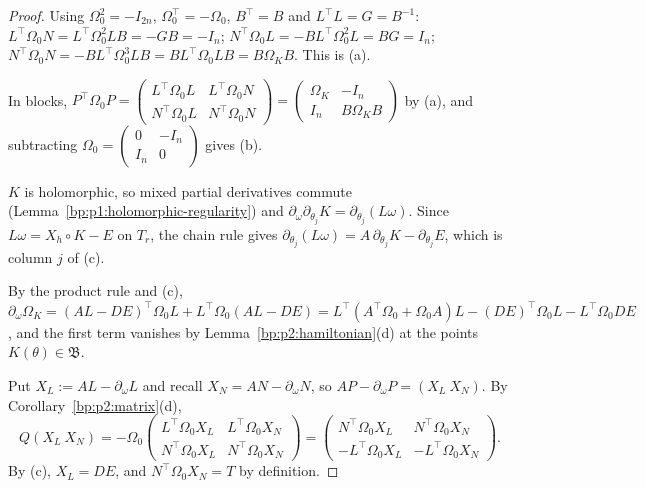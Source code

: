 \begin{proof}
\label{step:p2:fi-products}
Using $\Omega_0^2=-I_{2n}$, $\Omega_0^\top=-\Omega_0$, $B^\top=B$ and $L^\top L=G=B^{-1}$:
$L^\top\Omega_0N=L^\top\Omega_0^2LB=-GB=-I_n$; $N^\top\Omega_0L=-BL^\top\Omega_0^2L=BG=I_n$;
$N^\top\Omega_0N=-BL^\top\Omega_0^3LB=BL^\top\Omega_0LB=B\Omega_KB$. This is (a).

\label{step:p2:fi-sym}
In blocks, $P^\top\Omega_0P=\left(\begin{smallmatrix}L^\top\Omega_0L&L^\top\Omega_0N\\
N^\top\Omega_0L&N^\top\Omega_0N\end{smallmatrix}\right)=\left(\begin{smallmatrix}\Omega_K&-I_n\\
I_n&B\Omega_KB\end{smallmatrix}\right)$ by (a), and subtracting
$\Omega_0=\left(\begin{smallmatrix}0&-I_n\\I_n&0\end{smallmatrix}\right)$ gives (b).

\label{step:p2:fi-dl}
$K$ is holomorphic, so mixed partial derivatives commute (Lemma~\ref{bp:p1:holomorphic-regularity}) and
$\partial_\omega\partial_{\theta_j}K=\partial_{\theta_j}(L\omega)$. Since $L\omega=X_h\circ K-E$ on $T_r$,
the chain rule gives $\partial_{\theta_j}(L\omega)=A\,\partial_{\theta_j}K-\partial_{\theta_j}E$, which
is column $j$ of (c).

\label{step:p2:fi-domegak}
By the product rule and (c),
$\partial_\omega\Omega_K=(AL-DE)^\top\Omega_0L+L^\top\Omega_0(AL-DE)
=L^\top(A^\top\Omega_0+\Omega_0A)L-(DE)^\top\Omega_0L-L^\top\Omega_0DE$, and the first term vanishes
by Lemma~\ref{bp:p2:hamiltonian}(d) at the points $K(\theta)\in\mathfrak B$.

\label{step:p2:fi-blocks}
Put $X_L:=AL-\partial_\omega L$ and recall $X_N=AN-\partial_\omega N$, so $AP-\partial_\omega
P=(X_L\ X_N)$. By Corollary~\ref{bp:p2:matrix}(d),
\[
Q(X_L\ X_N)=-\Omega_0\begin{pmatrix}L^\top\Omega_0X_L&L^\top\Omega_0X_N\\N^\top\Omega_0X_L&N^\top\Omega_0X_N
\end{pmatrix}=\begin{pmatrix}N^\top\Omega_0X_L&N^\top\Omega_0X_N\\-L^\top\Omega_0X_L&-L^\top\Omega_0X_N
\end{pmatrix}.
\]
By (c), $X_L=DE$, and $N^\top\Omega_0X_N=T$ by definition.


\end{proof}
